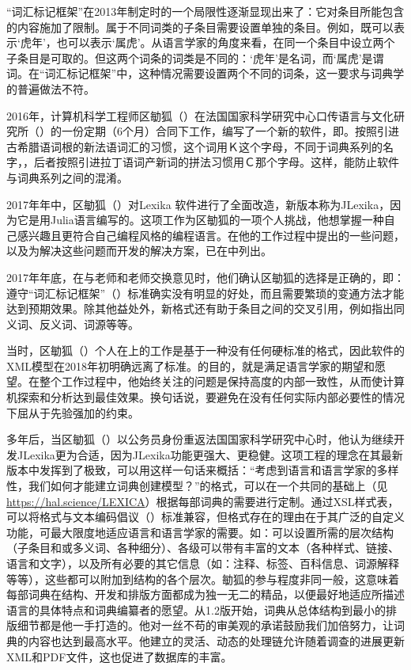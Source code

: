 “词汇标记框架”在2013年制定时的一个局限性逐渐显现出来了：它对条目所能包含的内容施加了限制。属于不同词类的子条目需要设置单独的条目。例如，既可以表示‘虎年’，也可以表示‘属虎’。从语言学家的角度来看，在同一个条目中设立两个子条目是可取的。但这两个词条的词类是不同的：‘虎年’是名词，而‘属虎’是谓词。在“词汇标记框架”中，这种情况需要设置两个不同的词条，这一要求与词典学的普遍做法不符。

2016年，计算机科学工程师区勄狐（）在法国国家科学研究中心口传语言与文化研究所（）的一份定期（6个月）合同下工作，编写了一个新的软件，即。按照引进古希腊语词根的新法语词汇的习惯，这个词用Ｋ这个字母，不同于词典系列的名字，\parencite{lexica2017}，后者按照引进拉丁语词产新词的拼法习惯用Ｃ那个字母。这样，能防止软件与词典系列之间的混淆。

2017年年中，区勄狐（）对Lexika 软件进行了全面改造\parencite{galliot:2017:lexika}，新版本称为JLexika，因为它是用Julia语言编写的。这项工作为区勄狐的一项个人挑战，他想掌握一种自己感兴趣且更符合自己编程风格的编程语言。在他的工作过程中提出的一些问题，以及为解决这些问题而开发的解决方案，已在\textcite{galliot:2023:lexikaproblématiques}中列出。

2017年年底，在与老师和老师交换意见时，他们确认区勄狐的选择是正确的，即：遵守“词汇标记框架”（）标准确实没有明显的好处，而且需要繁琐的变通方法才能达到预期效果。除其他益处外，新格式还有助于条目之间的交叉引用，例如指出同义词、反义词、词源等等。

当时，区勄狐（）个人在上的工作是基于一种没有任何硬标准的格式，因此软件的XML模型在2018年初明确远离了标准。的目的，就是满足语言学家的期望和愿望。在整个工作过程中，他始终关注的问题是保持高度的内部一致性，从而使计算机探索和分析达到最佳效果。换句话说，要避免在没有任何实际内部必要性的情况下屈从于先验强加的约束。

多年后，当区勄狐（）以公务员身份重返法国国家科学研究中心时，他认为继续开发JLexika更为合适，因为JLexika功能更强大、更稳健。这项工程的理念在其最新版本中发挥到了极致，可以用这样一句话来概括：“考虑到语言和语言学家的多样性，我们如何才能建立词典创建模型？”的格式，可以在一个共同的基础上（见\url{https://hal.science/LEXICA}）根据每部词典的需要进行定制。通过XSL样式表，可以将格式与文本编码倡议（）标准兼容，但格式存在的理由在于其广泛的自定义功能，可最大限度地适应语言和语言学家的需要。如：可以设置所需的层次结构（子条目和或多义词、各种细分）、各级可以带有丰富的文本（各种样式、链接、语言和文字），以及所有必要的其它信息（如：注释、标签、百科信息、词源解释等等），这些都可以附加到结构的各个层次。勄狐的参与程度非同一般，这意味着每部词典在结构、开发和排版方面都成为独一无二的精品，以便最好地适应所描述语言的具体特点和词典编纂者的愿望。从1.2版开始，词典从总体结构到最小的排版细节都是他一手打造的。他对一丝不苟的审美观的承诺鼓励我们加倍努力，让词典的内容也达到最高水平。他建立的灵活、动态的处理链允许随着调查的进展更新XML和PDF文件，这也促进了数据库的丰富。

